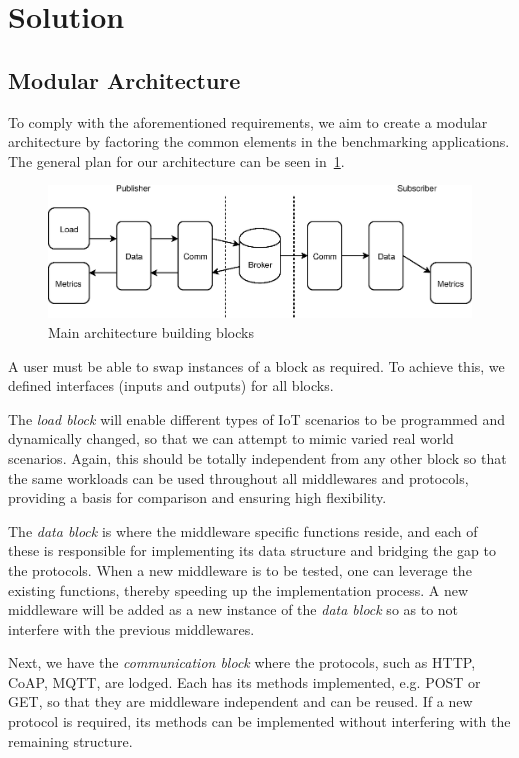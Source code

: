 \documentclass[conference]{IEEEtran}
\begin{document}
\section{Solution}

\subsection{Modular Architecture}

To comply with the aforementioned requirements, we aim to create a modular architecture by factoring the common elements in the benchmarking applications. The general plan for our architecture can be seen in~\ref{fig:benchmark_architecture}.

\begin{figure}[htbp!]
  \centering
  \includegraphics[width=\linewidth]{figures/benchmark_architecture.eps}
  \caption{Main architecture building blocks}
  \label{fig:benchmark_architecture}
\end{figure}

A user must be able to swap instances of a block as required. To achieve this, we defined interfaces (inputs and outputs) for all blocks. 

The \textit{load block} will enable different types of IoT scenarios to be programmed and dynamically changed, so that we can attempt to mimic varied real world scenarios. Again, this should be totally independent from any other block so that the same workloads can be used throughout all middlewares and protocols, providing a basis for comparison and ensuring high flexibility. 
    
The \textit{data block} is where the middleware specific functions reside, and each of these is responsible for implementing its data structure and bridging the gap to the protocols. When a new middleware is to be tested, one can leverage the existing functions, thereby speeding up the implementation process. A new middleware will be added as a new instance of the \textit{data block} so as to not interfere with the previous middlewares.

Next, we have the \textit{communication block} where the protocols, such as HTTP, CoAP, MQTT, are lodged. Each has its methods implemented, e.g. POST or GET, so that they are middleware independent and can be reused. If a new protocol is required, its methods can be implemented without interfering with the remaining structure.
\end{document}
